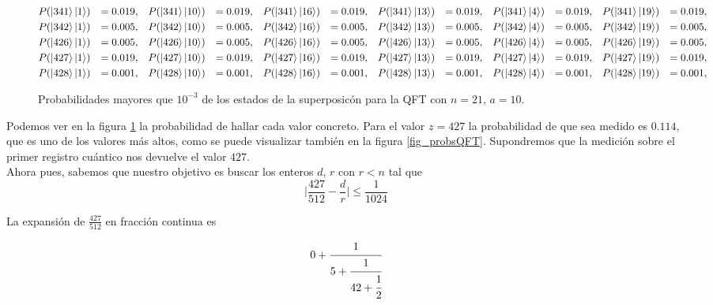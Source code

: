 \documentclass[11pt, spanish]{report}
\numberwithin{equation}{section}
\numberwithin{defin}{section}
\begin{document}
\begin{appendices}
\begin{figure}[]
{{{\begin{alignat*}{12}
&P(\ket{ 341 }\ket{ 1 })&=0.019,\quad  &P(\ket{ 341 }\ket{ 10 })&=0.019,\quad  &P(\ket{ 341 }\ket{ 16 })&=0.019,\quad  &P(\ket{ 341 }\ket{ 13 })&=0.019,\quad  &P(\ket{ 341 }\ket{ 4 })&=0.019,\quad  &P(\ket{ 341 }\ket{ 19 })&=0.019,\quad  \\
&P(\ket{ 342 }\ket{ 1 })&=0.005,\quad  &P(\ket{ 342 }\ket{ 10 })&=0.005,\quad  &P(\ket{ 342 }\ket{ 16 })&=0.005,\quad  &P(\ket{ 342 }\ket{ 13 })&=0.005,\quad  &P(\ket{ 342 }\ket{ 4 })&=0.005,\quad  &P(\ket{ 342 }\ket{ 19 })&=0.005,\quad  \\
&P(\ket{ 426 }\ket{ 1 })&=0.005,\quad  &P(\ket{ 426 }\ket{ 10 })&=0.005,\quad  &P(\ket{ 426 }\ket{ 16 })&=0.005,\quad  &P(\ket{ 426 }\ket{ 13 })&=0.005,\quad  &P(\ket{ 426 }\ket{ 4 })&=0.005,\quad  &P(\ket{ 426 }\ket{ 19 })&=0.005,\quad  \\
&P(\ket{ 427 }\ket{ 1 })&=0.019,\quad  &P(\ket{ 427 }\ket{ 10 })&=0.019,\quad  &P(\ket{ 427 }\ket{ 16 })&=0.019,\quad  &P(\ket{ 427 }\ket{ 13 })&=0.019,\quad  &P(\ket{ 427 }\ket{ 4 })&=0.019,\quad  &P(\ket{ 427 }\ket{ 19 })&=0.019,\quad  \\
&P(\ket{ 428 }\ket{ 1 })&=0.001,\quad  &P(\ket{ 428 }\ket{ 10 })&=0.001,\quad  &P(\ket{ 428 }\ket{ 16 })&=0.001,\quad  &P(\ket{ 428 }\ket{ 13 })&=0.001,\quad  &P(\ket{ 428 }\ket{ 4 })&=0.001,\quad  &P(\ket{ 428 }\ket{ 19 })&=0.001,\quad
\end{alignat*}
}%
}}
\caption{Probabilidades mayores que $10^{-3}$ de los estados de la superposicón para la QFT con $n=21$, $a=10$.}\label{fig:QFTExample}
\end{figure}

Podemos ver en la figura \ref{fig:QFTExample} la probabilidad de hallar cada valor concreto. Para el valor $z=427$ la probabilidad de que sea medido es $0.114$, que es uno de los valores más altos, como se puede visualizar también en la figura \ref{fig_probsQFT}. Supondremos que la medición sobre el primer registro cuántico nos devuelve el valor $427$.\\

Ahora pues, sabemos que nuestro objetivo es buscar los enteros $d$, $r$ con $r<n$ tal que
\begin{equation}
\Big| \frac{427}{512} - \frac{d}{r}\Big|\leq \frac{1}{1024}
\end{equation}

La expansión de $\frac{427}{512}$ en fracción continua es

\begin{equation}
0+\cfrac{1}{5+\cfrac{1}{42+\cfrac{1}{2}}}
\end{equation}


\end{appendices}
\end{document}
